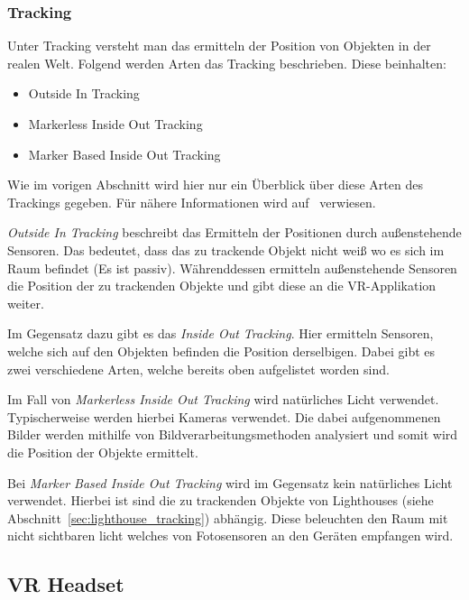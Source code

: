 \subsubsection{Tracking}
\label{sec:tracking}

Unter Tracking versteht man das ermitteln der Position von Objekten in der realen Welt.
Folgend werden Arten das Tracking beschrieben.
Diese beinhalten:

\begin{itemize}
    \item Outside In Tracking
    \item Markerless Inside Out Tracking
    \item Marker Based Inside Out Tracking
\end{itemize}

Wie im vorigen Abschnitt wird hier nur ein Überblick über diese Arten des Trackings gegeben.
Für nähere Informationen wird auf~\cite{Dennis_Ziesecke_2019} verwiesen.

\emph{Outside In Tracking} beschreibt das Ermitteln der Positionen durch außenstehende Sensoren.
Das bedeutet, dass das zu trackende Objekt nicht weiß wo es sich im Raum befindet (Es ist passiv).
Währenddessen ermitteln außenstehende Sensoren die Position der zu trackenden Objekte und gibt diese an die VR-Applikation weiter.

Im Gegensatz dazu gibt es das \emph{Inside Out Tracking}.
Hier ermitteln Sensoren, welche sich auf den Objekten befinden die Position derselbigen.
Dabei gibt es zwei verschiedene Arten, welche bereits oben aufgelistet worden sind.

Im Fall von \emph{Markerless Inside Out Tracking} wird natürliches Licht verwendet.
Typischerweise werden hierbei Kameras verwendet.
Die dabei aufgenommenen Bilder werden mithilfe von Bildverarbeitungsmethoden analysiert und somit wird die Position der Objekte ermittelt.

Bei \emph{Marker Based Inside Out Tracking} wird im Gegensatz kein natürliches Licht verwendet.
Hierbei ist sind die zu trackenden Objekte von Lighthouses (siehe Abschnitt~\ref{sec:lighthouse_tracking}) abhängig.
Diese beleuchten den Raum mit nicht sichtbaren licht welches von Fotosensoren an den Geräten empfangen wird.


\subsection{VR Headset}
\label{sec:vr-headset}

